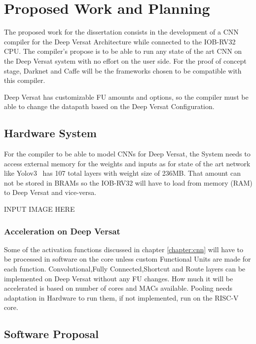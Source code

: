 \chapter{Proposed Work and Planning}
\label{chapter:PWP}

\quad The proposed work for the dissertation consists in the development of a CNN compiler for the Deep Versat Architecture
while connected to the IOB-RV32 CPU.
The compiler's propose is to be able to run any state of the art CNN on the Deep Versat system with no effort on the user side. For the proof of concept
stage, Darknet and Caffe will be the frameworks chosen to be compatible with this compiler.

Deep Versat has customizable FU amounts and options, so the compiler must be able to change the datapath based on the Deep Versat Configuration.
  

\section{Hardware System}

\quad For the compiler to be able to model CNNs for Deep Versat, the System needs to access external memory for the weights and inputs as for state of the art network like 
Yolov3~\cite{yolov3} has 107 total layers with weight size of 236MB. That amount can not be stored in BRAMs so the IOB-RV32 will have
to load from memory (RAM) to Deep Versat and vice-versa.

INPUT IMAGE HERE 


\subsection{Acceleration on Deep Versat}

\quad Some of the activation functions discussed in chapter \ref{chapter:cnn} will have to be processed in software on the core unless
custom Functional Units are made for each function. Convolutional,Fully Connected,Shortcut and Route layers can be implemented on Deep Versat without
any FU changes. How much it will be accelerated is based on number of cores and MACs available. Pooling needs adaptation in Hardware to run them, if not implemented, run on the RISC-V core.


\newpage
\section{Software Proposal}


